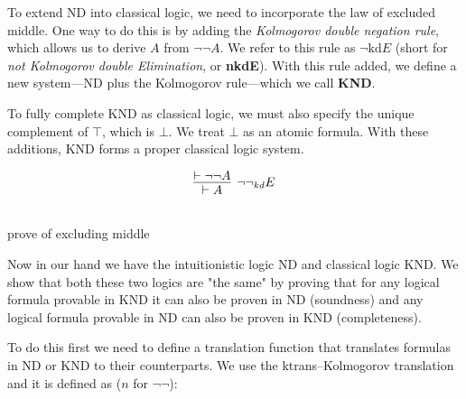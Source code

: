 \documentclass{article}
\begin{document}
To extend ND into classical logic, we need to incorporate the law of excluded middle. One way to do this is by adding the \emph{Kolmogorov double negation rule}, which allows us to derive $A$ from $\neg\neg A$. We refer to this rule as $\neg\text{kd}E$ (short for \emph{not Kolmogorov double Elimination}, or \textbf{nkdE}). With this rule added, we define a new system—ND plus the Kolmogorov rule—which we call \textbf{KND}.

To fully complete KND as classical logic, we must also specify the unique complement of $\top$, which is $\bot$. We treat $\bot$ as an atomic formula. With these additions, KND forms a proper classical logic system.

\[
\infer[\neg\neg_{kd}E]{\vdash A}{\vdash \neg\neg A}
\]

\begin{center}
\\
prove of excluding middle

\end{center}





Now in our hand we have the intuitionistic logic ND
 and classical logic KND. We show that both these two
  logics are "the same" by proving that for any logical formula provable in KND it can also be proven in ND (soundness) and any logical formula provable in ND can also be proven in KND (completeness).

To do this first we need to define a translation function that translates formulas in ND or KND to their counterparts. We use the ktrans--Kolmogorov translation and it is defined as ($n$ for $\neg\neg$):
\end{document}
